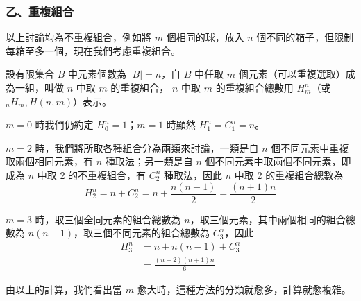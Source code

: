\subsubsection*{乙、重複組合}

以上討論均為不重複組合，例如將 $m$ 個相同的球，放入 $n$ 個不同的箱子，但限制每箱至多一個，現在我們考慮重複組合。

\medskip
\begin{definition*}
設有限集合 $B$ 中元素個數為 $|B| = n$，自 $B$ 中任取 $m$ 個元素（可以重複選取）成為一組，叫做 $n$ 中取 $m$ 的重複組合， $n$ 中取 $m$ 的重複組合總數用 $H_m^n$（或 ${}_n H_m, H(n, m)$）表示。
\end{definition*}

$m = 0$ 時我們仍約定 $H_0^n = 1$；$m = 1$ 時顯然 $H_1^n = C_1^n = n$。

$m = 2$ 時，我們將所取各種組合分為兩類來討論，一類是自 $n$ 個不同元素中重複取兩個相同元素，有 $n$ 種取法；另一類是自 $n$ 個不同元素中取兩個不同元素，即成為 $n$ 中取 2 的不重複組合，有 $C_2^n$ 種取法，因此 $n$ 中取 2 的重複組合總數為
\[
H_2^n = n + C_2^n = n + \frac{n(n-1)}{2} = \frac{(n+1)n}{2}
\]

$m = 3$ 時，取三個全同元素的組合總數為 $n$，取三個元素，其中兩個相同的組合總數為 $n(n-1)$，取三個不同元素的組合總數為 $C_3^n$，因此
\begin{align*}
H_3^n &= n + n(n-1) + C_3^n \\
&= \frac{(n+2)(n+1)n}{6}
\end{align*}

由以上的計算，我們看出當 $m$ 愈大時，這種方法的分類就愈多，計算就愈複雜。

